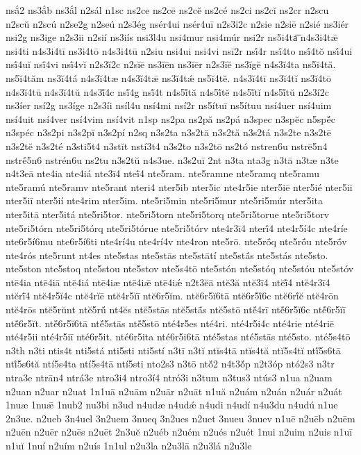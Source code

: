 {nsắ2
ns3ắb
ns3ắl
n2sál
n1sc
ns2ce
ns2cē
ns2cĕ
ns2cé
ns2ci
ns2cĭ
ns2cr
n2scu
n2scŭ
n2scú
n2se2g
n2seú
n2s3ég
nsér4ui
nsér4uī
n2s3i2c
n2sie
n2siē
n2sié
ns3iér
nsi2g
ns3ige
n2s3ii
n2sií
ns3iís
nsi3l4u
nsi4mur
nsi4múr
nsi2r
ns5i4ta͞
n4s3i4tǣ
nsi4ti
n4s3i4tī
ns3i4tō
n4s3i4tū
n2siu
nsi4ui
nsi4vi
nsī2r
nsī́4r
nsī́4to
nsī́4tŏ
nsī́4ui
nsī́4uĭ
nsī́4vi
nsī́4vĭ
n2s3ĭ2c
n2sĭē
ns3ĭēn
ns3ĭēr
n2s3ĭĕ
ns3ĭgĕ
n4s3ĭ4ta
ns5ĭ4tă.
ns5ĭ4tăm
ns3ĭ4tá
n4s3ĭ4tæ
n4s3ĭ4tǣ
ns3ĭ4tǽ
ns5ĭ4tĕ.
n4s3ĭ4tī
ns3ĭ4tĭ
ns3ĭ4tō
n4s3ĭ4tū
n4s3ĭ4tŭ
n4s3ĭ́4c
nsĭ́4g
nsĭ́4t
n4s5ĭ́tă
n4s5ĭ́tĕ
n4s5ĭ́tĭ
n4s5ĭ́tŭ
n2s3í2c
ns3íer
nsí2g
ns3íge
n2s3íi
nsíl4u
nsí4mi
nsí2r
ns5ítuī
ns5ítuu
nsí4uer
nsí4uim
nsí4uit
nsí4ver
nsí4vim
nsí4vit
n1sp
ns2pa
ns2pă
ns2pá
n3spec
n3spĕc
n5spĕ́c
n3spéc
n3s2pi
n3s2pĭ
n3s2pí
n2sq
n3s2ta
n3s2tā
n3s2tă
n3s2tá
n3s2te
n3s2tē
n3s2tĕ
n3s2té
n3sti5t4
n3stĭt
nstí3t4
n3s2to
n3s2tō
ns2tó
nstren6u
nstrē5n4
nstrḗ5n6
nstrén6u
ns2tu
n3s2tŭ
n4s3ue.
n3s2uī
2nt
n3ta
nta3g
n3tā
n3tæ
n3te
n4t3eā
nte4ia
nte4iá
nte3ī4
nteī́4
nte5ram.
nte5ramne
nte5ramq
nte5ramu
nte5ramú
nte5ramv
nte5rant
nteri4
nter5ib
nter5ic
nte4r5ie
nter5iē
nter5ié
nter5ii
nter5iī
nter5ií
nte4rim
nter5im.
nte5ri5min
nte5ri5mur
nte5ri5múr
nter5ita
nter5itā
nter5itá
nte5ri5tor.
nte5ri5torn
nte5ri5torq
nte5ri5torue
nte5ri5torv
nte5ri5tórn
nte5ri5tórq
nte5ri5tórue
nte5ri5tórv
nte4r3ī4
nterī́4
nte4r5í4c
nte4ríe
nte6r5í6mu
nte6r5í6ti
nte4rí4u
nte4rí4v
nte4ron
nte5rō.
nte5rṓq
nte5rṓu
nte5rṓv
nte4rós
nte5runt
nt4es
nte5stas
nte5stās
nte5stātí
nte5stā́s
nte5stás
nte5sto.
nte5ston
nte5stoq
nte5stou
nte5stov
nte5s4tō
nte5stón
nte5stóq
nte5stóu
nte5stóv
ntē4ia
ntē4iā
ntē4iá
ntē4iæ
ntē4iǣ
ntē4iǽ
n2t3ĕā
ntĕ3ă
ntĕ3ī4
ntĕī́4
ntĕ4r3ī4
ntĕrī́4
ntĕ4r5ĭ4c
ntĕ4rĭē
ntĕ4r5ĭī
ntĕ6r5ĭm.
ntĕ6r5ĭ6tā
ntĕ6r5ĭ́6c
ntĕ6rĭ́ĕ
ntĕ4rōn
ntĕ4rōs
ntĕ5rŭnt
ntĕ5rŭ́
nt4ĕs
ntĕ5stās
ntĕ5stā́s
ntĕ5stō
ntĕ́4rī
ntĕ́6r5ĭ6c
ntĕ́6r5ĭī
ntĕ́6r5ĭt.
ntĕ́6r5ĭ6tā
ntĕ́5stās
ntĕ́5stō
nté4r5es
nté4ri.
nté4r5i4c
nté4rie
nté4riē
nté4r5ii
nté4r5iī
nté6r5it.
nté6r5ita
nté6r5i6tā
nté5stas
nté5stās
nté5sto.
nté5s4tō
n3th
n3ti
ntis4t
nti5stá
nti5sti
nti5stí
n3tī
n3tĭ
ntĭs4tā
ntĭs4tă
ntĭ5s4tĭ
ntĭ́5s6tā
ntĭ́5s6tă
ntí5s4ta
ntí5s4tā
ntí5sti
nto2s3
n3tō
ntŏ́2
n4t3ŏ́p
n2t3óp
ntó2s3
n3tr
ntra3e
ntrān4
ntrá3e
ntro3i4
ntro3í4
ntró3i
n3tum
n3tus3
ntús3
n1ua
n2uam
n2uan
n2uar
n2uat
1n1uā
n2uām
n2uār
n2uāt
n1uă
n2uám
n2uán
n2uár
n2uát
1nuæ
1nuǣ
1nub2
nu3bi
n3ud
n4udæ
n4udǽ
n4udi
n4udí
n4u3du
n4udú
n1ue
2n3ue.
n2ueb
3n4uel
3n2uem
3nueq
3n2ues
n2uet
3nueu
3nuev
n1uē
n2uēb
n2uēm
n2uēn
n2uēr
n2uēs
n2uēt
2n3uĕ
n2uéb
n2uém
n2ués
n2uét
1nui
n2uim
n2uis
n1uī
n1uĭ
1nuí
n2uím
n2uís
1n1ul
n2u3la
n2u3lā
n2u3lá
n2u3le
}

